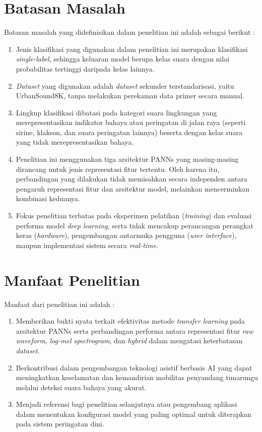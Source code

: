 \section{Batasan Masalah} \label{I.Batasan}
Batasan masalah yang didefinisikan dalam penelitian ini adalah sebagai berikut : \par

\begin{enumerate}[noitemsep]
  \item Jenis klasifikasi yang digunakan dalam penelitian ini merupakan klasifikasi \textit{single-label}, sehingga keluaran model berupa kelas suara dengan nilai probabilitas tertinggi daripada kelas lainnya.
  \item \textit{Dataset} yang digunakan adalah \textit{dataset} sekunder terstandarisasi, yaitu UrbanSound8K, tanpa melakukan perekaman data primer secara manual.
  \item Lingkup klasifikasi dibatasi pada kategori suara lingkungan yang merepresentasikan indikator bahaya atau peringatan di jalan raya (seperti sirine, klakson, dan suara peringatan lainnya) beserta dengan kelas suara yang tidak merepresentasikan bahaya.
  \item Penelitian ini menggunakan tiga arsitektur PANNs yang masing-masing dirancang untuk jenis representasi fitur tertentu. Oleh karena itu, perbandingan yang dilakukan tidak memisahkan secara independen antara pengaruh representasi fitur dan arsitektur model, melainkan mencerminkan kombinasi keduanya.
  \item Fokus penelitian terbatas pada eksperimen pelatihan (\textit{training}) dan evaluasi performa model \textit{deep learning}, serta tidak mencakup perancangan perangkat keras (\textit{hardware}), pengembangan antarmuka pengguna (\textit{user interface}), maupun implementasi sistem secara \textit{real-time}.
\end{enumerate}

\section{Manfaat Penelitian} \label{I.Manfaat}
Manfaat dari penelitian ini adalah : \par

\begin{enumerate}[noitemsep]
	\item Memberikan bukti nyata terkait efektivitas metode \textit{transfer learning} pada arsitektur PANNs serta perbandingan performa antara representasi fitur \textit{raw waveform}, \textit{log-mel spectrogram}, dan \textit{hybrid} dalam mengatasi keterbatasan \textit{dataset}.
	\item Berkontribusi dalam pengembangan teknologi asistif berbasis AI yang dapat meningkatkan keselamatan dan kemandirian mobilitas penyandang tunarungu melalui deteksi suara bahaya yang akurat.
	\item Menjadi referensi bagi penelitian selanjutnya atau pengembang aplikasi dalam menentukan konfigurasi model yang paling optimal untuk diterapkan pada sistem peringatan dini.
\end{enumerate}


